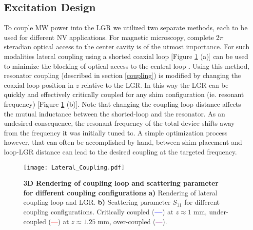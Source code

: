 \subsection{Excitation Design} \label{excitation}

To couple MW power into the LGR we utilized two separate methods, each to be used for different NV applications. For magnetic  microscopy, complete 2$\pi$ steradian optical access to the center cavity is of the utmost importance. For such modalities lateral coupling using a shorted coaxial loop [Figure \ref{LGR_Lateral} (a)] can be used to minimize the blocking of optical access to the central loop \cite{koskinen1992the}. Using this method, resonator coupling (described in section \ref{coupling}) is modified by changing the coaxial loop position in $z$ relative to the LGR. In this way the LGR can be quickly and effectively critically coupled for any shim configuration (ie. resonant frequency) [Figure \ref{LGR_Lateral} (b)]. Note that changing the coupling loop distance affects the mutual inductance between the shorted-loop and the resonator. As an undesired consequence, the resonant frequency of the total device shifts away from the frequency it was initially tuned to. A simple optimization process however, that can often be accomplished by hand, between shim placement and loop-LGR distance can lead to the desired coupling at the targeted frequency.

\begin{figure}[t!]
\centering
\texttt{[image: Lateral\_Coupling.pdf]}  
\caption{\textbf{3D Rendering of coupling loop and scattering parameter for different coupling configurations} \textbf{a)} Rendering of lateral coupling loop and LGR. \textbf{b)} Scattering parameter $S_{11}$ for different coupling configurations. Critically coupled (\textcolor{blue}{\textbf{---}}) at $z \approx 1$ mm, under-coupled (\textcolor{red}{---}) at $z \approx 1.25$ mm, over-coupled (\textcolor{purple}{---}). }
\label{LGR_Lateral}
\end{figure}

